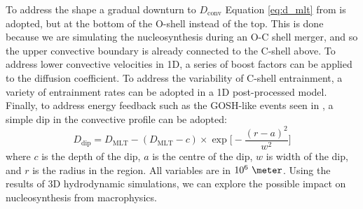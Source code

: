 To address the shape a gradual downturn to $D_{\mathrm{conv}}$ Equation \ref{eq:d_mlt} from \cite{jonesIdealizedHydrodynamicSimulations2017} is adopted, but at the bottom of the O-shell instead of the top.
This is done because we are simulating the nucleosynthesis during an O-C shell merger, and so the upper convective boundary is already connected to the C-shell above.
To address lower convective velocities in 1D, a series of boost factors can be applied to the diffusion coefficient.
To address the variability of C-shell entrainment, a variety of entrainment rates can be adopted in a 1D post-processed model.
Finally, to address energy feedback such as the GOSH-like events seen in \cite{andrassy3DHydrodynamicSimulations2020}, a simple dip in the convective profile can be adopted:
\begin{equation}
D_{\mathrm{dip}}=D_{\mathrm{MLT}}-(D_{\mathrm{MLT}}-c)\times\exp\Biggl[-\frac{(r-a)^2}{w^2}\Biggr]
\end{equation}
where $c$ is the depth of the dip, $a$ is the centre of the dip, $w$ is width of the dip, and $r$ is the radius in the region.
All variables are in $10^6~\meter$.
Using the results of 3D hydrodynamic simulations, we can explore the possible impact on nucleosynthesis from macrophysics.